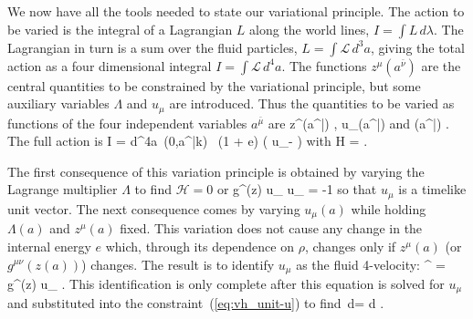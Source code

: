 We now have all the tools needed to state our variational
principle.
The action to be varied is the integral of a Lagrangian $L$ along
the world lines, $I = \int L\,d\lambda$.
The Lagrangian in turn is a sum over the fluid particles, $L =
\int {\mathcal L}\,d^3 a$, giving the total action as a four
dimensional integral $I = \int {\mathcal L}\,d^4 a$.
The functions $z^\mu(a^{\bar{\nu}})$ are the central quantities
to be constrained by the variational principle, but some
auxiliary variables $\Lambda$ and $u_\mu$ are introduced.
Thus the quantities to be varied as functions of the four
independent variables $a^{\bar{\mu}}$ are
\be
   z^\mu(a^{\bar{\nu}}) \quad , \quad u_\mu(a^{\bar{\nu}})
      \quad \mbox{and} \quad \Lambda(a^{\bar{\nu}}) \quad .
\ee
The full action is
\be\label{eq:vh_action}
  I = \int \!d^4a\,
\rho(0,a^{\bar{k}})
   \,
 (1 + e) \left(  u_\mu - 
  \right)
\ee
with
\be
 {\mathcal H} =  \left[ g^{\mu\nu}(z) u_{\mu} u_{\nu}
                                    + 1 \right]
     \quad .
\ee

The first consequence of this variation principle is obtained by
varying the Lagrange multiplier $\Lambda$ to find ${\mathcal H} =
0$ or
\be\label{eq:vh_unit-u}
     g^{\mu\nu}(z) u_{\mu} u_{\nu} = -1
\ee
so that $u_{\mu}$ is a timelike unit vector.
The next consequence comes by varying $u_{\mu} (a)$ while holding
$\Lambda (a)$ and $z^\mu (a)$ fixed.
This variation does not cause any change in the internal energy
$e$ which, through its dependence on $\rho$, changes only if
$z^\mu (a)$ (or $g^{\mu\nu}(z(a))$) changes.
The result is to identify $u_{\mu}$ as the fluid 4-velocity:
\be\label{eq:vh_zdot}
   ^\mu \equiv {}
     = \Lambda g^{\mu\nu}(z) u_{\nu}
     \quad .
\ee
This identification is only complete after this equation is
solved for $u_\mu$ and substituted into the
constraint~(\ref{eq:vh_unit-u}) to find
\be\label{eq:vh_Lambda}
     \Lambda\,d\lambda = d\tau \equiv
     \quad .
\ee


